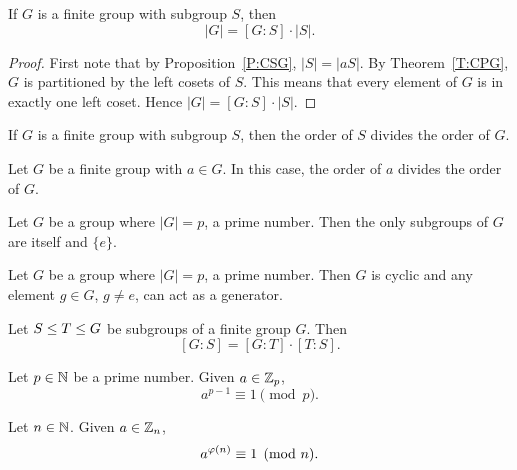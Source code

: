 \documentclass{ximera}
\begin{document}
\begin{theorem}\label{T:lagrange}
  If $G$ is a finite group with subgroup $S$, then 
  \[
  |G| = [G:S]\cdot |S|.
  \]
  \begin{proof}
    First note that by Proposition~\ref{P:CSG}, $|S| = |aS|$. By
    Theorem~\ref{T:CPG}, $G$ is partitioned by the left cosets of
    $S$. This means that every element of $G$ is in exactly one left
    coset. Hence $|G| = [G:S]\cdot |S|$.
  \end{proof}
\end{theorem}

\begin{corollary}
  If $G$ is a finite group with subgroup $S$, then the order of $S$
  divides the order of $G$.
\end{corollary}

\begin{corollary}\label{C:Leodgo}
  Let $G$ be a finite group with $a\in G$. In this case, the order of
  $a$ divides the order of $G$.
\end{corollary}


\begin{corollary}
  Let $G$ be a group where $|G|= p$, a prime number. Then the only
  subgroups of $G$ are itself and $\{e\}$.
\end{corollary}

\begin{corollary}
  Let $G$ be a group where $|G|= p$, a prime number. Then $G$ is
  cyclic and any element $g\in G$, $g\ne e$, can act as a generator.
\end{corollary}


\begin{corollary}
  Let $S \leq T \leq G$ be subgroups of a finite group
  $G$. Then
  \[
  [G:S] = [G:T]\cdot [T:S].
  \]
\end{corollary}


\begin{corollary}
  Let $p\in \mathbb N$ be a prime number. Given $a\in\mathbb Z_p$,
  \[
  a^{p-1}\equiv 1 \pmod{p}.
  \]
\end{corollary}


\begin{corollary}
  Let $n\in \mathbb N$. Given $a\in\mathbb Z_n$,
  \[
  a^{\eulerphi(n)}\equiv 1 \pmod{n}.
  \]
\end{corollary}
\end{document}
